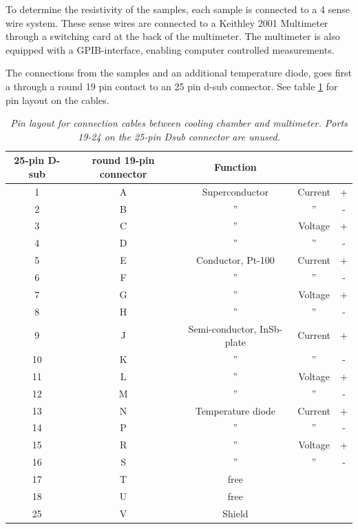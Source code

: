 \documentclass[a4paper,12pt]{article}
\begin{document}
To determine the resistivity of the samples, each sample is connected to a 4 sense wire system. These sense wires are connected to a Keithley 2001 Multimeter through a switching card at the back of the multimeter. The multimeter is also equipped with a GPIB-interface, enabling computer controlled measurements. 

The connections from the samples and an additional temperature diode, goes first a through a round 19 pin contact to an 25 pin d-sub connector. See table \ref{tab:PinNumbers} for pin layout on the cables.

\begin{table}[H]
	
  \caption{\emph{Pin layout for connection cables between cooling chamber and multimeter. Ports 19-24 on the 25-pin Dsub connector are  unused.}} 
  
  \begin{tabular}{c|c|c c c}
  \label{tab:PinNumbers}
  25-pin D-sub & round 19-pin connector & Function & & \\
  \hline
  1  & A & Superconductor    & Current & + \\
  2  & B & ''                & ''      & - \\
  3  & C & ''                & Voltage & + \\
  4  & D & ''                & ''      & - \\
  5  & E & Conductor, Pt-100            & Current & + \\
  6  & F & ''                & ''      & - \\
  7  & G & ''                & Voltage & + \\
  8  & H & ''                & ''      & - \\
  9  & J & Semi-conductor, InSb-plate        & Current & + \\
  10 & K & ''                & ''      & - \\
  11 & L & ''                & Voltage & + \\
  12 & M & ''                & ''      & - \\
  13 & N & Temperature diode & Current & + \\
  14 & P & ''                & ''      & - \\
  15 & R & ''                & Voltage & + \\
  16 & S & ''                & ''      & - \\   
  17 & T & free              &         &  \\
  18 & U & free              &         &  \\
  25 & V & Shield            &         &  \\ 
  \end{tabular}
  
\end{table} 
\end{document}
